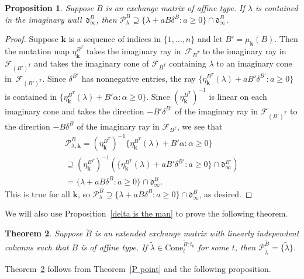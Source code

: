 \documentclass{amsart}
\newtheorem{proposition}{Proposition}[section]
\newtheorem{theorem}[proposition]{Theorem}
\theoremstyle{definition}
\theoremstyle{remark}
\numberwithin{equation}{section}
\newcommand{\set}[1]{{\lbrace #1 \rbrace}}
\newcommand{\F}{{\mathcal F}}
\newcommand{\0}{{\mathbf{0}}}
\newcommand{\Cone}{\mathrm{Cone}}
\newcommand{\kk}{{\boldsymbol{k}}}
\newcommand{\tB}{{\widetilde{B}}}
\renewcommand{\P}{\mathcal{P}}
\renewcommand{\d}{{\mathfrak d}}
\begin{document}
\begin{proposition}\label{affine main partial}
Suppose $B$ is an exchange matrix of affine type.
If $\lambda$ is contained in the imaginary wall~$\d^B_\infty$, then $\P^B_\lambda\supseteq\set{\lambda+aB\delta^B:a\ge0}\cap\d^B_\infty$.  %
\end{proposition}
\begin{proof}
Suppose $\kk$ is a sequence of indices in $\set{1,\ldots,n}$ and let $B'=\mu_\kk(B)$.
Then the mutation map $\eta^{B^T}_\kk$ takes the imaginary ray in~$\F_{B^T}$ to the imaginary ray in~$\F_{(B')^T}$ and takes the imaginary cone of $\F_{B^T}$ containing $\lambda$ to an imaginary cone in~$\F_{(B')^T}$.
Since $\delta^{B'}$ has nonnegative entries, the ray $\set{\eta^{B^T}_\kk(\lambda)+aB'\delta^{B'}:a\ge0}$ is contained in $\set{\eta^{B^T}_\kk(\lambda)+B'\alpha:\alpha\ge0}$.
Since $(\eta_\kk^{B^T})^{-1}$ is linear on each imaginary cone and takes the direction $-B'\delta^{B'}$ of the imaginary ray in $\F_{(B')^T}$ to the direction $-B\delta^B$ of the imaginary ray in $\F_{B^T}$, we see that 
\begin{multline*}
\P^B_{\lambda,\kk}=(\eta_\kk^{B^T})^{-1}\set{\eta^{B^T}_\kk(\lambda)+B'\alpha:\alpha\ge0}\\
\supseteq(\eta_\kk^{B^T})^{-1}\left(\set{\eta^{B^T}_\kk(\lambda)+aB'\delta^{B'}:a\ge0}\cap\d^{B'}_\infty\right)\\
=\set{\lambda+aB\delta^B:a\ge0}\cap\d^B_\infty. 
\end{multline*}
This is true for all $\kk$, so $\P^B_\lambda\supseteq\set{\lambda+aB\delta^B:a\ge0}\cap\d^B_\infty$, as desired.
\end{proof}

We will also use Proposition~\ref{delta is the man} to prove the following theorem.

\begin{theorem}\label{affine P point indep}
Suppose $\tB$ is an extended exchange matrix with linearly independent columns such that $B$ is of affine type.
  If $\tilde\lambda\in\Cone^{\tB;t_0}_t$ for some $t$, then $\P^\tB_{\tilde\lambda}=\set{\tilde\lambda}$.
\end{theorem}

Theorem~\ref{affine P point indep} follows from Theorem~\ref{P point} and the following proposition.
\end{document}
